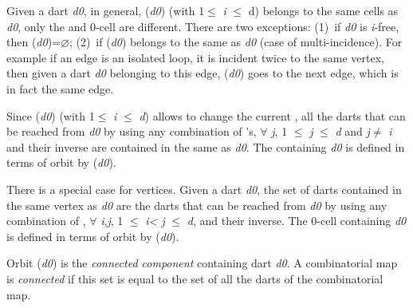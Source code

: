 Given a dart \emph{d0}, in general, \betai{}(\emph{d0}) (with 1$\leq$ \emph{i} $\leq$ d)
belongs to the same cells as \emph{d0}, only the  and 0-cell are
different.  There are two exceptions: (1)~if \emph{d0} is \emph{i}-free, then
\betai{}(\emph{d0})=$\varnothing$; (2)~if \betai{}(\emph{d0}) belongs to the same 
as \emph{d0} (case of multi-incidence). For example if an edge is an isolated
loop, it is incident twice to the same vertex, then given a dart \emph{d0}
belonging to this edge, \betaun{}(\emph{d0}) goes to the next edge, which is in
fact the same edge.

Since \betai{}(\emph{d0}) (with 1$\leq$ \emph{i} $\leq$ \emph{d}) allows to change the
current , all the darts that can be reached from \emph{d0} by
using any combination of \betaj{}'s, $\forall$ \emph{j}, 1 $\leq$ \emph{j} $\leq$ \emph{d} and
\emph{j}$\neq$ \emph{i} and their inverse are contained in the same  as
\emph{d0}.  The  containing \emph{d0} is defined in terms of orbit by
\orbit{\betaun{},$\ldots$,\betaimun{},\betaipun{},$\ldots$,\betad{}}(\emph{d0}).


There is a special case for vertices. Given a dart \emph{d0}, the set of
darts contained in the same vertex as \emph{d0} are the darts that can be
reached from \emph{d0} by using any combination of \betai{}\comp{}\betaj{},
$\forall$ \emph{i},\emph{j}, 1 $\leq$ \emph{i< j} $\leq$ \emph{d}, and their inverse.  The 0-cell
containing \emph{d0} is defined in terms of orbit by
(\emph{d0}).


Orbit \orbit{\betaun{},$\ldots$,\betad{}}(\emph{d0}) is the \emph{connected
  component} containing dart \emph{d0}. A combinatorial map is
\emph{connected} if this set is equal to the set of all the darts
of the combinatorial map.

%

